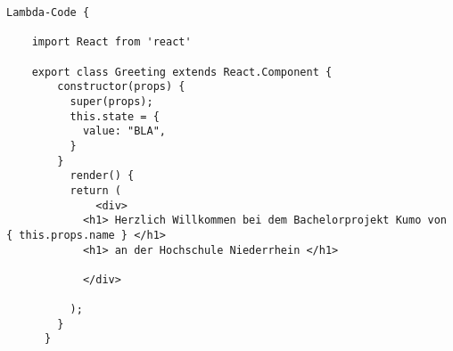 

\begin{lstlisting}[caption={React Greeting.js Render a Greeting},
label=lst:React Greeting ,basicstyle=\ttfamily\small ] Lambda-Code {

    import React from 'react'

    export class Greeting extends React.Component {
        constructor(props) {
          super(props);
          this.state = {
            value: "BLA",
          }
        }
          render() {
          return (
              <div>
            <h1> Herzlich Willkommen bei dem Bachelorprojekt Kumo von { this.props.name } </h1>
            <h1> an der Hochschule Niederrhein </h1>

            </div>

          );
        }
      }



\end{lstlisting}
